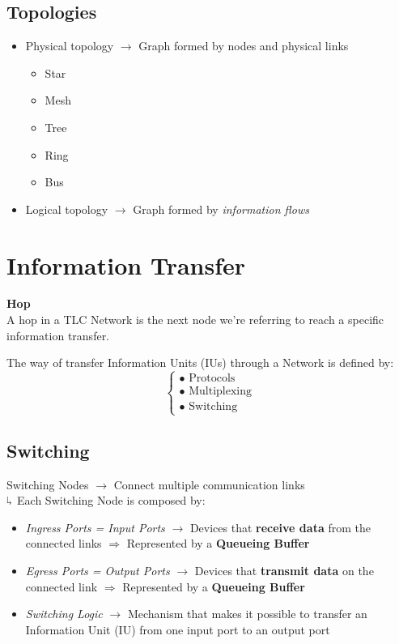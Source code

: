 \subsection{Topologies}
\begin{itemize}
\item Physical topology $\rightarrow$ Graph formed by nodes and physical links

\begin{itemize}
\item Star
\item Mesh
\item Tree
\item Ring
\item Bus
\end{itemize}
\item Logical topology $\rightarrow$ Graph formed by \textit{information flows}
\end{itemize}

\section{Information Transfer}
\begin{definition}{\textbf{Hop}\\}
A hop in a TLC Network is the next node we're referring to reach a specific information transfer. 
\end{definition}

The way of transfer Information Units (IUs) through a Network is defined by:
\begin{equation}
\begin{cases}
\bullet \text{ Protocols}\\
\bullet \text{ Multiplexing}\\
\bullet \text{ Switching}
\end{cases}
\end{equation}

\subsection{Switching}

Switching Nodes $\rightarrow$ Connect multiple communication links \\ $\rotatebox[origin=c]{180}{$\Lsh$}$ Each Switching Node is composed by:
\begin{itemize}
\item \textit{Ingress Ports = Input Ports} $\rightarrow$ Devices that \textbf{receive data} from the connected links $\Rightarrow$ Represented by a \textbf{Queueing Buffer}
\item \textit{Egress Ports = Output Ports} $\rightarrow$ Devices that \textbf{transmit data} on the connected link $\Rightarrow$ Represented by a \textbf{Queueing Buffer}
\item \textit{Switching Logic} $\rightarrow$ Mechanism that makes it possible to transfer an Information Unit (IU) from one input port to an output port 
\end{itemize}


